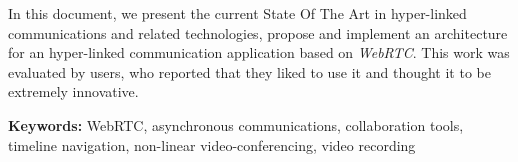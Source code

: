 In this document, we present the current State Of The Art in hyper-linked communications and related technologies, propose and implement an architecture for an hyper-linked communication application based on \emph{WebRTC}. This work was evaluated by users, who reported that they liked to use it and thought it to be extremely innovative. 


\vspace{1cm}

\textbf{\Large Keywords:} WebRTC, asynchronous communications, collaboration tools, timeline navigation, non-linear video-conferencing, video recording


\cleardoublepage
